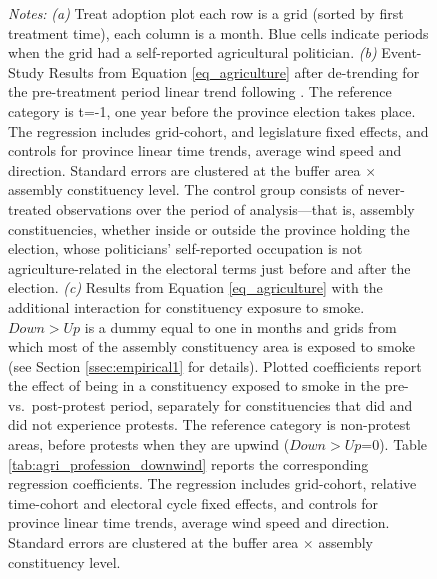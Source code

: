 \documentclass[12pt]{article}
\begin{document}
\begin{figure}[hbtp!]
    
    \begin{minipage}{\textwidth}
        {\small \textit{Notes: }\textit{(a)} 
        Treat adoption plot each row is a grid (sorted by first treatment time), each column is a month. Blue cells indicate periods when the grid had a self-reported agricultural politician.
        \textit{(b)} Event-Study Results from Equation \ref{eq_agriculture} after de-trending for the pre-treatment period linear trend following \citet{dustmann2022reallocation}. The reference category is t=-1, one year before the province election takes place. 
        The regression includes grid-cohort, and legislature fixed effects, and controls for province linear time trends, average wind speed and direction. Standard errors are clustered at the buffer area $\times$ assembly constituency level. The control group consists of never-treated observations over the period of analysis—that is, assembly constituencies, whether inside or outside the province holding the election, whose politicians' self-reported occupation is not agriculture-related in the electoral terms just before and after the election. 
        \textit{(c)} Results from Equation \ref{eq_agriculture} with the additional interaction for constituency exposure to smoke. $Down>Up$ is a dummy equal to one in months and grids from which most of the assembly constituency area is exposed to smoke (see Section \ref{ssec:empirical1} for details).
        Plotted coefficients report the effect of being in a constituency exposed to smoke in the pre- vs.\ post-protest period, separately for constituencies that did and did not experience protests. The reference category is non-protest areas, before protests when they are upwind ($Down>Up$=0).
        Table \ref{tab:agri_profession_downwind} reports the corresponding regression coefficients.
        The regression includes grid-cohort, relative time-cohort and electoral cycle fixed effects, and controls for province linear time trends, average wind speed and direction. Standard errors are clustered at the buffer area $\times$ assembly constituency level.
        }
    \end{minipage}
\end{figure}
\end{document}

